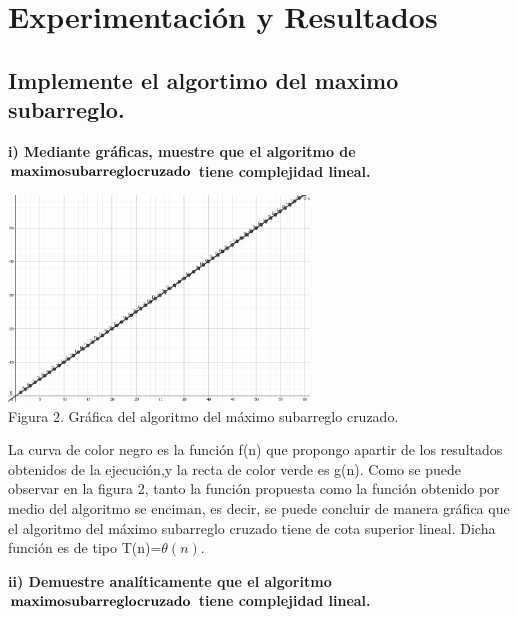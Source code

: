\documentclass[spanish]{article}
\begin{document}
	\newpage	

	\section{Experimentaci\'on y Resultados}
	
	\subsection{Implemente el algortimo del maximo subarreglo.}
	
	{\large{ {\bf i) Mediante gráficas, muestre que el algoritmo de  ${\bf maximo subarreglo cruzado}$ tiene complejidad lineal.}}}\\

	\bigskip

	\begin{center}
		\includegraphics[width=0.60\textwidth]{./imagenes/msc.png}\\
		Figura 2. Gráfica del algoritmo del máximo subarreglo cruzado.\\
	\end{center}


	\bigskip

La curva de color negro es la función f(n) que propongo apartir de los resultados obtenidos de la ejecución,y  la recta de color verde es g(n). Como se puede observar en la figura 2, tanto la función propuesta como la función obtenido por medio del algoritmo se enciman, es decir, se puede concluir de manera gráfica que el algoritmo del máximo subarreglo cruzado tiene de cota superior lineal. Dicha función es de tipo T(n)=${\theta(n)}$.\

	\bigskip
\newpage
	{\large{\bf ii)  Demuestre analíticamente que el algoritmo  ${\bf maximo subarreglo cruzado}$ tiene complejidad lineal.}}\\
	
	\bigskip
	
\end{document}

